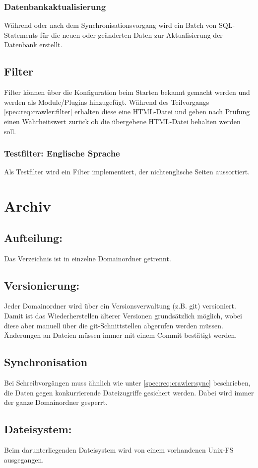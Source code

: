 	\subsubsection{Datenbankaktualisierung}
		Während oder nach dem Synchronisationsvorgang wird ein Batch von SQL-Statements für die neuen oder geänderten Daten
		zur Aktualisierung der Datenbank erstellt.
\subsection{Filter}
	Filter können über die Konfiguration beim Starten bekannt gemacht werden und werden als Module/Plugins hinzugefügt.
	Während des Teilvorgangs \ref{spec:req:crawler:filter} erhalten diese eine HTML-Datei und geben nach Prüfung einen Wahrheitswert zurück
	ob die übergebene HTML-Datei behalten werden soll.
	\subsubsection{Testfilter: Englische Sprache}
		Als Testfilter wird ein Filter implementiert, der nichtenglische Seiten aussortiert.


\section{Archiv} \label{spec:req:archive}
\subsection{Aufteilung:}\label{spec:req:archive:dist}
	Das Verzeichnis ist in einzelne Domainordner getrennt. 
\subsection{Versionierung:}\label{spec:req:archive:vers}
	Jeder Domainordner wird über ein Versionsverwaltung (z.B. git) versioniert. 
	Damit ist das Wiederherstellen älterer Versionen grundsätzlich möglich,
	wobei diese aber manuell über die git-Schnittstellen abgerufen werden müssen.
	Änderungen an Dateien müssen immer mit einem Commit bestätigt werden.
\subsection{Synchronisation}\label{spec:req:archive:sync}
	Bei Schreibvorgängen muss ähnlich wie unter \ref{spec:req:crawler:sync} beschrieben, 
	die Daten gegen konkurrierende Dateizugriffe gesichert werden.
	Dabei wird immer der ganze Domainordner gesperrt.
\subsection{Dateisystem:} \label{spec:req:archive:fs}
	Beim darunterliegenden Dateisystem wird von einem vorhandenen Unix-FS ausgegangen.
